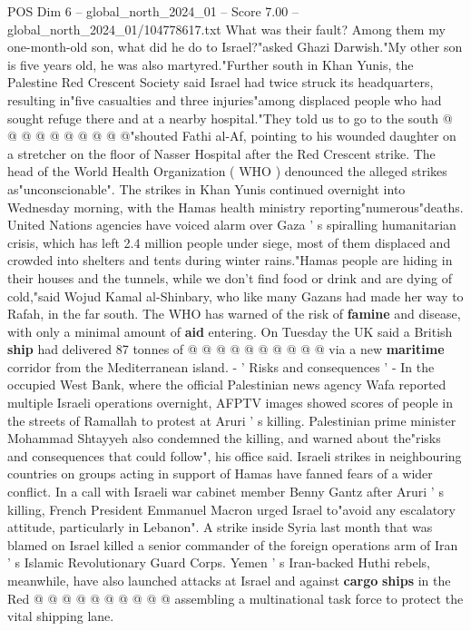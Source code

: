 \begin{textsample}{POS Dim 6 – global\_north\_2024\_01 – Score 7.00 – global\_north\_2024\_01/104778617.txt}
What was their fault?
Among them my one-month-old son, what did he do to Israel?"asked Ghazi Darwish."My other son is five years old, he was also martyred."Further south in Khan Yunis, the Palestine Red Crescent Society said Israel had twice struck its headquarters, resulting in"five casualties and three injuries"among displaced people who had sought refuge there and at a nearby hospital."They told us to go to the south @ @ @ @ @ @ @ @ @ @"shouted Fathi al-Af, pointing to his wounded daughter on a stretcher on the floor of Nasser Hospital after the Red Crescent strike.
The head of the World Health Organization ( WHO ) denounced the alleged strikes as"unconscionable".
The strikes in Khan Yunis continued overnight into Wednesday morning, with the Hamas health ministry reporting"numerous"deaths.
United Nations agencies have voiced alarm over Gaza ' s spiralling humanitarian crisis, which has left 2.4 million people under siege, most of them displaced and crowded into shelters and tents during winter rains."Hamas people are hiding in their houses and the tunnels, while we don't find food or drink and are dying of cold,"said Wojud Kamal al-Shinbary, who like many Gazans had made her way to Rafah, in the far south.
The WHO has warned of the risk of \textbf{famine} and disease, with only a minimal amount of \textbf{aid} entering.
On Tuesday the UK said a British \textbf{ship} had delivered 87 tonnes of @ @ @ @ @ @ @ @ @ @ via a new \textbf{maritime} corridor from the Mediterranean island. - ' Risks and consequences ' - In the occupied West Bank, where the official Palestinian news agency Wafa reported multiple Israeli operations overnight, AFPTV images showed scores of people in the streets of Ramallah to protest at Aruri ' s killing.
Palestinian prime minister Mohammad Shtayyeh also condemned the killing, and warned about the"risks and consequences that could follow", his office said.
Israeli strikes in neighbouring countries on groups acting in support of Hamas have fanned fears of a wider conflict.
In a call with Israeli war cabinet member Benny Gantz after Aruri ' s killing, French President Emmanuel Macron urged Israel to"avoid any escalatory attitude, particularly in Lebanon".
A strike inside Syria last month that was blamed on Israel killed a senior commander of the foreign operations arm of Iran ' s Islamic Revolutionary Guard Corps.
Yemen ' s Iran-backed Huthi rebels, meanwhile, have also launched attacks at Israel and against \textbf{cargo} \textbf{ships} in the Red @ @ @ @ @ @ @ @ @ @ assembling a multinational task force to protect the vital shipping lane.

\end{textsample}
